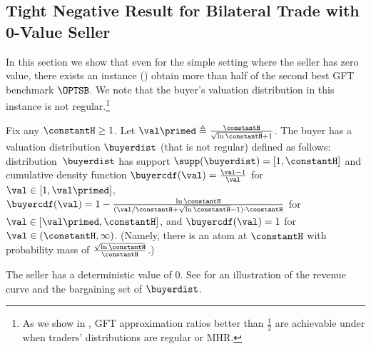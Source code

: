 \subsection{Tight Negative Result for Bilateral Trade with 0-Value Seller}
\label{subsec:optimal GFT upper bound:general instance}
In this section we show that even for the simple setting where the seller has zero value, there exists an instance () 
obtain more than half of the second best GFT benchmark $\OPTSB$. 
We note that the buyer's valuation distribution in this instance is not regular.\footnote{As we show in ,  GFT approximation ratios better than $\frac{1}{2}$ are achievable under {\ksfairness} when traders' distributions are regular or MHR.}


\begin{example}
\label{example:all fair mech:irregular}
Fix any $\constantH \geq 1$. Let $\val\primed \triangleq \frac{\constantH}{\sqrt{\ln\constantH} + 1}$. The buyer has a valuation distribution $\buyerdist$ (that is not regular) defined as follows: %
distribution~$\buyerdist$ 
has support $\supp(\buyerdist)=[1, \constantH]$ and cumulative density function $\buyercdf(\val) = \frac{\val - 1}{\val}$ for $\val \in[1,\val\primed]$, $\buyercdf(\val) = 1- 
\frac{{\ln\constantH}}{(\val/\constantH+\sqrt{\ln\constantH}-1)\cdot \constantH}$ for $\val\in[\val\primed, \constantH]$, and $\buyercdf(\val) = 1$ for $\val \in(\constantH, \infty)$.  
(Namely, there is an atom at $\constantH$ with probability mass of $\frac{\sqrt{\ln\constantH}}{\constantH}$.)

The seller has a deterministic value of 0. See  for an illustration of the revenue curve and the bargaining set of $\buyerdist$. 
\end{example}

%      

